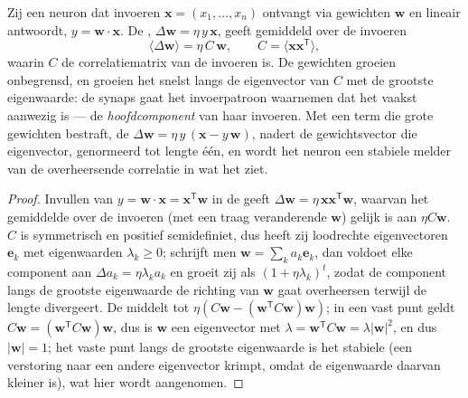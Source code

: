 \begin{theorem}\label{thm:b3:learning-memory:hebb}
Zij een neuron dat invoeren $\mathbf{x} = (x_{1},\dots,x_{n})$ ontvangt
via gewichten $\mathbf{w}$ en lineair antwoordt, $y = \mathbf{w}\cdot\mathbf{x}$.
De , $\Delta\mathbf{w} = \eta\, y\,\mathbf{x}$, geeft
gemiddeld over de invoeren
\[
\langle\Delta\mathbf{w}\rangle = \eta\,C\,\mathbf{w}, \qquad C =
\langle\mathbf{x}\mathbf{x}^{\mathsf{T}}\rangle ,
\]
waarin $C$ de correlatiematrix van de invoeren is. De gewichten groeien
onbegrensd, en groeien het snelst langs de eigenvector van $C$ met de
grootste eigenwaarde: de synaps gaat het invoerpatroon waarnemen dat
het vaakst aanwezig is --- de \emph{hoofdcomponent} van haar invoeren.
Met een term die grote gewichten bestraft, de \emph{}
$\Delta\mathbf{w} = \eta\, y\,(\mathbf{x} - y\,\mathbf{w})$, nadert de
gewichtsvector die eigenvector, genormeerd tot lengte één, en wordt het
neuron een stabiele melder van de overheersende correlatie in wat het
ziet.
\end{theorem}
\begin{proof}
Invullen van $y = \mathbf{w}\cdot\mathbf{x} = \mathbf{x}^{\mathsf{T}}
\mathbf{w}$ in de  geeft $\Delta\mathbf{w} = \eta\,\mathbf{x}
\mathbf{x}^{\mathsf{T}}\mathbf{w}$, waarvan het gemiddelde over de
invoeren (met een traag veranderende
$\mathbf{w}$) gelijk is aan $\eta C\mathbf{w}$. $C$ is symmetrisch en
positief semidefiniet, dus heeft zij loodrechte eigenvectoren $\mathbf{e}_{k}$
met eigenwaarden $\lambda_{k} \ge 0$; schrijft men $\mathbf{w} = \sum_{k}
a_{k}\mathbf{e}_{k}$, dan voldoet elke component aan $\Delta a_{k} = \eta\lambda_{k}
a_{k}$ en groeit zij als $(1 + \eta\lambda_{k})^{t}$, zodat de
component langs de grootste eigenwaarde de richting van $\mathbf{w}$
gaat overheersen terwijl de lengte divergeert. De  middelt
tot $\eta(C\mathbf{w} -
(\mathbf{w}^{\mathsf{T}}C\mathbf{w})\mathbf{w})$; in een vast punt geldt
$C\mathbf{w} = (\mathbf{w}^{\mathsf{T}}C\mathbf{w})\mathbf{w}$, dus is
$\mathbf{w}$ een eigenvector met $\lambda = \mathbf{w}^{\mathsf{T}}
C\mathbf{w} = \lambda|\mathbf{w}|^{2}$, en dus $|\mathbf{w}| = 1$; het
vaste punt langs de grootste eigenwaarde is het stabiele (een
verstoring naar een andere eigenvector krimpt, omdat de eigenwaarde
daarvan kleiner is), wat hier wordt aangenomen.
\end{proof}

